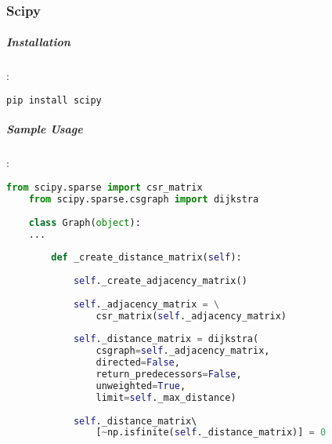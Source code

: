 	\subsubsection{Scipy \cite{Scipy}}
	\subparagraph{Installation}:
	\begin{lstlisting}[language=bash]
	pip install scipy
	\end{lstlisting}
	
	\subparagraph{Sample Usage}:
	\begin{lstlisting}[language=python, caption=Scipy example]
	from scipy.sparse import csr_matrix
	from scipy.sparse.csgraph import dijkstra
	
	class Graph(object):
	...
	
		def _create_distance_matrix(self):
	
			self._create_adjacency_matrix()
	
			self._adjacency_matrix = \
				csr_matrix(self._adjacency_matrix)
	
			self._distance_matrix = dijkstra( 
				csgraph=self._adjacency_matrix, 
				directed=False, 
				return_predecessors=False, 
				unweighted=True,
				limit=self._max_distance)
	
			self._distance_matrix\ 
				[~np.isfinite(self._distance_matrix)] = 0
	\end{lstlisting}